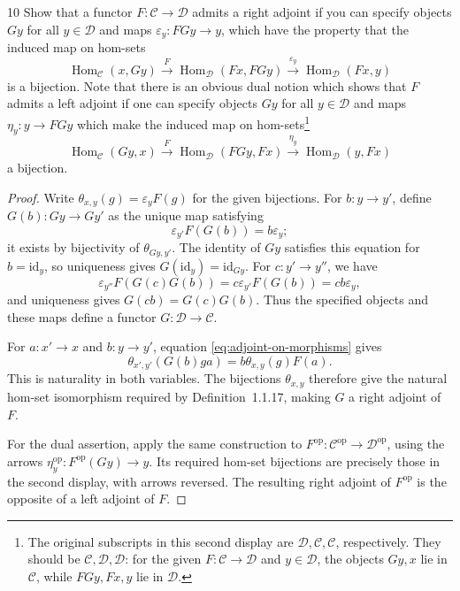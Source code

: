 \begin{exercise}{10}
Show that a functor $F\colon\mathcal C\to\mathcal D$ admits a right
adjoint if you can specify objects $Gy$ for all $y\in\mathcal D$ and
maps $\varepsilon_y\colon FGy\to y$, which have the property that the
induced map on hom-sets
\[
 \operatorname{Hom}_{\mathcal C}(x,Gy)
 \xrightarrow{\ F\ }\operatorname{Hom}_{\mathcal D}(Fx,FGy)
 \xrightarrow{\ \varepsilon_y\ }\operatorname{Hom}_{\mathcal D}(Fx,y)
\]
is a bijection. Note that there is an obvious dual notion which shows
that $F$ admits a left adjoint if one can specify objects $Gy$ for all
$y\in\mathcal D$ and maps $\eta_y\colon y\to FGy$ which make the
induced map on hom-sets\footnote{The original subscripts in this
second display are $\mathcal D,\mathcal C,\mathcal C$, respectively.
They should be $\mathcal C,\mathcal D,\mathcal D$: for the given
$F\colon\mathcal C\to\mathcal D$ and $y\in\mathcal D$, the objects
$Gy,x$ lie in $\mathcal C$, while $FGy,Fx,y$ lie in $\mathcal D$.}
\[
 \operatorname{Hom}_{\mathcal C}(Gy,x)
 \xrightarrow{\ F\ }\operatorname{Hom}_{\mathcal D}(FGy,Fx)
 \xrightarrow{\ \eta_y\ }\operatorname{Hom}_{\mathcal D}(y,Fx)
\]
a bijection.

\begin{proof}
Write $\theta_{x,y}(g)=\varepsilon_yF(g)$ for the given bijections.
For $b\colon y\to y'$, define $G(b)\colon Gy\to Gy'$ as the unique
map satisfying
\begin{equation}\label{eq:adjoint-on-morphisms}
 \varepsilon_{y'}F(G(b))=b\varepsilon_y;
\end{equation}
it exists by bijectivity of $\theta_{Gy,y'}$.
The identity of $Gy$ satisfies this equation for $b=\mathrm{id}_y$,
so uniqueness gives $G(\mathrm{id}_y)=\mathrm{id}_{Gy}$.
For $c\colon y'\to y''$, we have
\[
 \varepsilon_{y''}F(G(c)G(b))
   =c\varepsilon_{y'}F(G(b))=cb\varepsilon_y,
\]
and uniqueness gives $G(cb)=G(c)G(b)$.
Thus the specified objects and these maps define a functor
$G\colon\mathcal D\to\mathcal C$.

For $a\colon x'\to x$ and $b\colon y\to y'$, equation
\eqref{eq:adjoint-on-morphisms} gives
\[
 \theta_{x',y'}(G(b)ga)=b\theta_{x,y}(g)F(a).
\]
This is naturality in both variables. The bijections $\theta_{x,y}$
therefore give the natural hom-set isomorphism required by
Definition~1.1.17, making $G$ a right adjoint of $F$.

For the dual assertion, apply the same construction to
$F^{\mathrm{op}}\colon\mathcal C^{\mathrm{op}}\to
\mathcal D^{\mathrm{op}}$, using the arrows
$\eta_y^{\mathrm{op}}\colon F^{\mathrm{op}}(Gy)\to y$.
Its required hom-set bijections are precisely those in the second
display, with arrows reversed. The resulting right adjoint of
$F^{\mathrm{op}}$ is the opposite of a left adjoint of $F$.
\end{proof}
\end{exercise}
